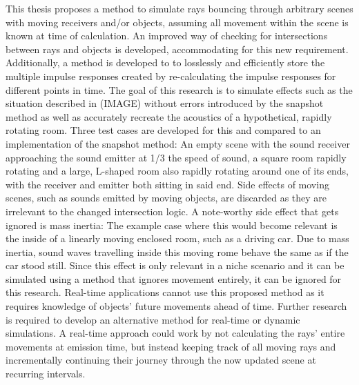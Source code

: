 This thesis proposes a method to simulate rays bouncing through arbitrary scenes with moving receivers and/or objects,
assuming all movement within the scene is known at time of calculation.
An improved way of checking for intersections between rays and objects is developed, accommodating for this new requirement.
Additionally, a method is developed to to losslessly and efficiently store the multiple impulse responses created by re-calculating
the impulse responses for different points in time.
The goal of this research is to simulate effects such as the situation described in (IMAGE) without errors introduced by the snapshot method
as well as accurately recreate the acoustics of a hypothetical, rapidly rotating room.
Three test cases are developed for this and compared to an implementation of the snapshot method:
An empty scene with the sound receiver approaching the sound emitter at 1/3 the speed of sound,
a square room rapidly rotating
and a large, L-shaped room also rapidly rotating around one of its ends, with the receiver and emitter both sitting in said end.
\newline
Side effects of moving scenes, such as sounds emitted by moving objects, are discarded as they are irrelevant to
the changed intersection logic.
A note-worthy side effect that gets ignored is mass inertia:
The example case where this would become relevant is the inside of a linearly moving enclosed room, such as a driving car.
Due to mass inertia, sound waves travelling inside this moving rome behave the same as if the car stood still.
Since this effect is only relevant in a niche scenario and it can be simulated using a method that ignores movement entirely,
it can be ignored for this research.
\newline
Real-time applications cannot use this proposed method as it requires knowledge of objects' future movements ahead of time.
Further research is required to develop an alternative method for real-time or dynamic simulations.
A real-time approach could work by not calculating the rays' entire movements at emission time,
but instead keeping track of all moving rays and incrementally continuing their journey through the now updated scene
at recurring intervals.
